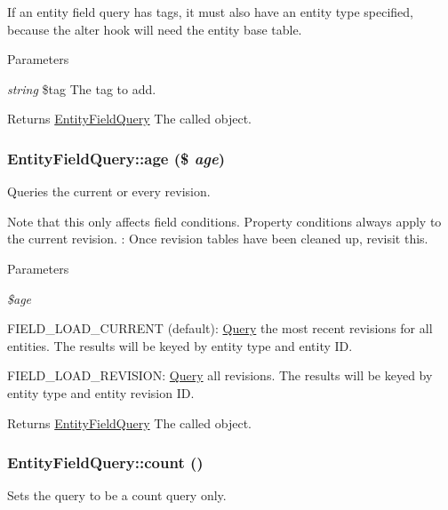If an entity field query has tags, it must also have an entity type specified, because the alter hook will need the entity base table.


\begin{DoxyParams}{Parameters}
\item[{\em string}]\$tag The tag to add.\end{DoxyParams}
\begin{DoxyReturn}{Returns}
\hyperlink{classEntityFieldQuery}{EntityFieldQuery} The called object. 
\end{DoxyReturn}
\hypertarget{classEntityFieldQuery_af6fbd7296e3c833f8a31769e0c1c866a}{
\subsubsection[{age}]{\setlength{\rightskip}{0pt plus 5cm}EntityFieldQuery::age (\$ {\em age})}}
\label{classEntityFieldQuery_af6fbd7296e3c833f8a31769e0c1c866a}
Queries the current or every revision.

Note that this only affects field conditions. Property conditions always apply to the current revision. : Once revision tables have been cleaned up, revisit this.


\begin{DoxyParams}{Parameters}
\item[{\em \$age}]
\begin{DoxyItemize}
\item FIELD\_\-LOAD\_\-CURRENT (default): \hyperlink{classQuery}{Query} the most recent revisions for all entities. The results will be keyed by entity type and entity ID.
\item FIELD\_\-LOAD\_\-REVISION: \hyperlink{classQuery}{Query} all revisions. The results will be keyed by entity type and entity revision ID.
\end{DoxyItemize}\end{DoxyParams}
\begin{DoxyReturn}{Returns}
\hyperlink{classEntityFieldQuery}{EntityFieldQuery} The called object. 
\end{DoxyReturn}
\hypertarget{classEntityFieldQuery_afa3972b551da6115ad5749646df151d4}{
\subsubsection[{count}]{\setlength{\rightskip}{0pt plus 5cm}EntityFieldQuery::count ()}}
\label{classEntityFieldQuery_afa3972b551da6115ad5749646df151d4}
Sets the query to be a count query only.

